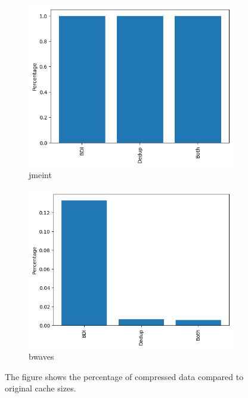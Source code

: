 \begin{figure}
    \begin{subfigure}{\textwidth}
        \includegraphics[width=\textwidth]{jmeint.png}
        \caption{jmeint}
        \label{fig:jmeint}
    \end{subfigure}
    \begin{subfigure}{\textwidth}
        \includegraphics[width=\textwidth]{bwaves.png}
        \caption{bwaves}
        \label{fig:bwaves}
    \end{subfigure}
    \caption[Compression in benchmarks2]{The figure shows the percentage of compressed data compared to original cache sizes.}
\end{figure}

